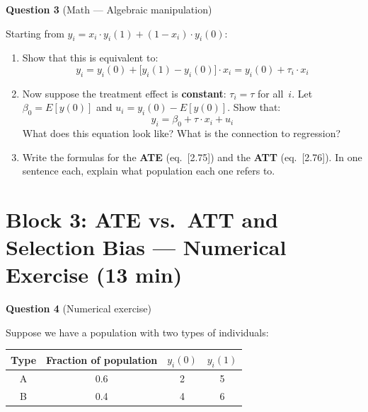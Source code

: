 \documentclass[11pt,a4paper]{article}
\begin{document}
\newpage
\textbf{Question 3} (Math --- Algebraic manipulation)

\medskip
Starting from $y_i = x_i \cdot y_i(1) + (1 - x_i)\cdot y_i(0)$:

\begin{enumerate}[label=(\alph*)]
\item Show that this is equivalent to:
\[
  y_i = y_i(0) + \bigl[y_i(1) - y_i(0)\bigr]\cdot x_i = y_i(0) + \tau_i \cdot x_i
\]

\begin{answerbox}
\vspace{5cm}
\end{answerbox}

\item Now suppose the treatment effect is \textbf{constant}: $\tau_i = \tau$ for all~$i$. Let $\beta_0 = E[y(0)]$ and $u_i = y_i(0) - E[y(0)]$. Show that:
\[
  y_i = \beta_0 + \tau \cdot x_i + u_i
\]
What does this equation look like? What is the connection to regression?

\begin{answerbox}
\vspace{5cm}
\end{answerbox}

\item Write the formulas for the \textbf{ATE} (eq.~[2.75]) and the \textbf{ATT} (eq.~[2.76]). In one sentence each, explain what population each one refers to.

\begin{answerbox}
\vspace{4cm}
\end{answerbox}
\end{enumerate}

\newpage
\section{Block 3: ATE vs.\ ATT and Selection Bias --- Numerical Exercise \textnormal{(13 min)}}

\textbf{Question 4} (Numerical exercise)

\medskip
Suppose we have a population with two types of individuals:

\begin{center}
\begin{tabular}{cccc}
\toprule
Type & Fraction of population & $y_i(0)$ & $y_i(1)$ \\
\midrule
A & 0.6 & 2 & 5 \\
B & 0.4 & 4 & 6 \\
\bottomrule
\end{tabular}
\end{center}
\end{document}
